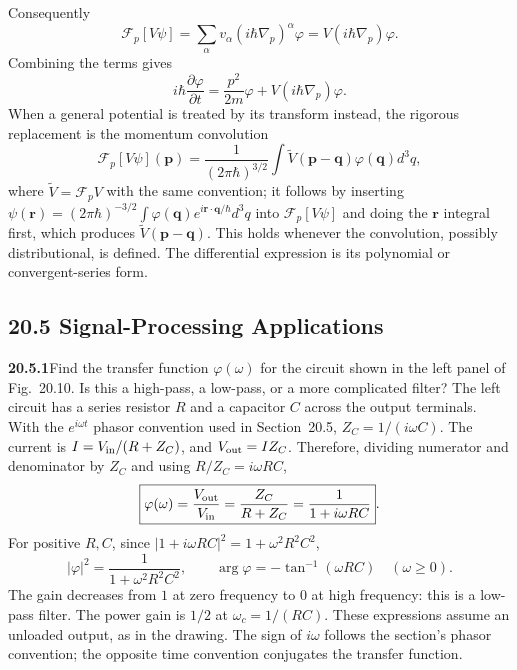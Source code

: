 Consequently
\[
\mathcal F_p[V\psi]=\sum_\alpha v_\alpha(i\hbar\nabla_p)^\alpha\varphi
=V(i\hbar\nabla_p)\varphi.
\]
Combining the terms gives
\[
\boxed{i\hbar\frac{\partial\varphi}{\partial t}
=\frac{p^2}{2m}\varphi+V(i\hbar\nabla_p)\varphi}.
\]
When a general potential is treated by its transform instead,
the rigorous replacement is the momentum convolution
\[
\mathcal F_p[V\psi](\mathbf p)
=\frac1{(2\pi\hbar)^{3/2}}\int
\widetilde V(\mathbf p-\mathbf q)\varphi(\mathbf q)d^3q,
\]
where $\widetilde V=\mathcal F_pV$ with the same convention; it
follows by inserting
$\psi(\mathbf r)=(2\pi\hbar)^{-3/2}\int\varphi(\mathbf q)
e^{i\mathbf r\cdot\mathbf q/\hbar}d^3q$ into $\mathcal F_p[V\psi]$
and doing the $\mathbf r$ integral first, which produces
$\widetilde V(\mathbf p-\mathbf q)$. This holds
whenever the convolution, possibly distributional, is defined.
The differential expression is its polynomial or convergent-series
form.

\subsection*{20.5 Signal-Processing Applications}

\par\bigskip
\noindent\textbf{20.5.1}\quad Find the transfer function
$\varphi(\omega)$ for the circuit shown in the left panel of
Fig.~20.10. Is this a high-pass, a low-pass, or a more complicated
filter?
\solution
The left circuit has a series resistor $R$ and a capacitor $C$
across the output terminals. With the $e^{i\omega t}$ phasor
convention used in Section~20.5, $Z_C=1/(i\omega C)$. The
current is $I=V_{\rm in}/(R+Z_C)$, and $V_{\rm out}=IZ_C$.
Therefore, dividing numerator and denominator by $Z_C$ and using
$R/Z_C=i\omega RC$,
\[
\boxed{\varphi(\omega)=\frac{V_{\rm out}}{V_{\rm in}}
=\frac{Z_C}{R+Z_C}=\frac1{1+i\omega RC}}.
\]
For positive $R,C$, since $|1+i\omega RC|^2=1+\omega^2R^2C^2$,
\[
|\varphi|^2=\frac1{1+\omega^2R^2C^2},\qquad
\arg\varphi=-\tan^{-1}(\omega RC)\quad(\omega\ge0).
\]
The gain decreases from $1$ at zero frequency to $0$ at high
frequency: this is a low-pass filter. The power gain is $1/2$
at $\omega_c=1/(RC)$. These expressions assume an unloaded
output, as in the drawing. The sign of $i\omega$ follows the
section's phasor convention; the opposite time convention
conjugates the transfer function.

